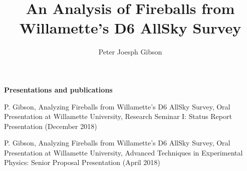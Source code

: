 \documentclass[12pt]{report}
\begin{document}
\title{An Analysis of Fireballs from Willamette's D6 AllSky Survey}
\author{Peter Joesph Gibson}

\maketitle


\newpage

\begin{center}
\textbf{Presentations and publications}

P. Gibson, Analyzing Fireballs from Willamette's D6 AllSky Survey, Oral Presentation at Willamette University, Research Seminar I: Status Report Presentation (December 2018)
\bigskip

P. Gibson, Analyzing Fireballs from Willamette's D6 AllSky Survey, Oral Presentation at Willamette University, Advanced Techniques in Experimental Physics: Senior Proposal Presentation (April 2018)

\bigskip
\end{center}



\begin{acknowledgments}

\end{acknowledgments}

\begin{abstract}

\end{abstract}

\tableofcontents
\listoffigures



%
%
%
%

%
%
%
\printbibliography

%
\end{document}

